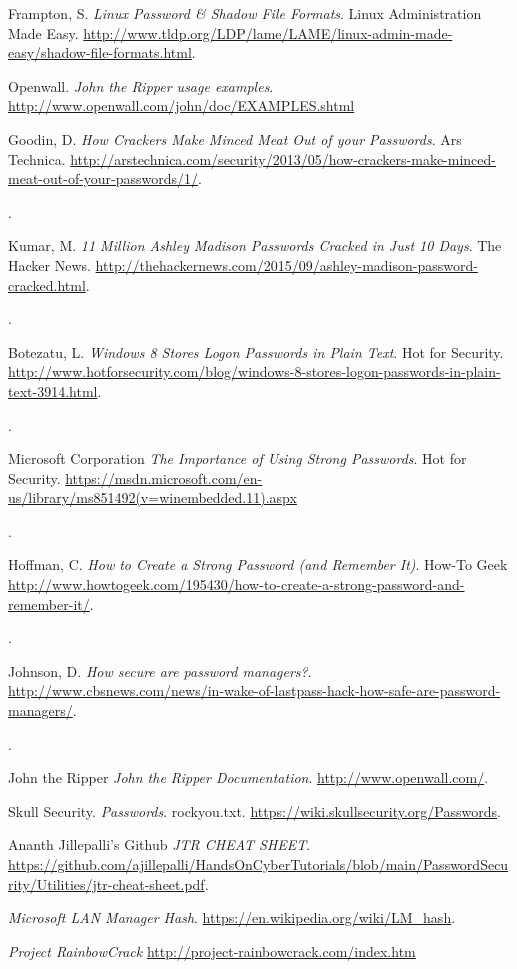 \documentclass[12pt]{extarticle}
\begin{document}
	\begin{thebibliography}{9}
		
		Frampton, S.
		\textit{Linux Password \& Shadow File Formats}.
		Linux Administration Made Easy.
		\url{http://www.tldp.org/LDP/lame/LAME/linux-admin-made-easy/shadow-file-formats.html}.
		
		Openwall.
		\textit{John the Ripper usage examples}.
		\url{http://www.openwall.com/john/doc/EXAMPLES.shtml}
		
		Goodin, D.
		\textit{How Crackers Make Minced Meat Out of your Passwords}.
		Ars Technica.
		\url{http://arstechnica.com/security/2013/05/how-crackers-make-minced-meat-out-of-your-passwords/1/}.
		\date{May 2013}.
		
		Kumar, M.
		\textit{11 Million Ashley Madison Passwords Cracked in Just 10 Days}.
		The Hacker News.
		\url{http://thehackernews.com/2015/09/ashley-madison-password-cracked.html}.
		\date{Sept 2015}.
		
		Botezatu, L.
		\textit{Windows 8 Stores Logon Passwords in Plain Text}.
		Hot for Security.
		\url{http://www.hotforsecurity.com/blog/windows-8-stores-logon-passwords-in-plain-text-3914.html}.
		\date{Oct 2015}.
		
		Microsoft Corporation
		\textit{The Importance of Using Strong Passwords}.
		Hot for Security.
		\url{https://msdn.microsoft.com/en-us/library/ms851492(v=winembedded.11).aspx}
		\date{2006}.
		
		Hoffman, C.
		\textit{How to Create a Strong Password (and Remember It)}.
		How-To Geek
		\url{http://www.howtogeek.com/195430/how-to-create-a-strong-password-and-remember-it/}.
		\date{May 2015}.
		
		Johnson, D.
		\textit{How secure are password managers?}.
		\url{http://www.cbsnews.com/news/in-wake-of-lastpass-hack-how-safe-are-password-managers/}.
		\date{June 2015}.
		
		John the Ripper
		\textit{John the Ripper Documentation}.
		\url{http://www.openwall.com/}.
		
		Skull Security.
		\textit{Passwords}.
		rockyou.txt.
		\url{https://wiki.skullsecurity.org/Passwords}.
		
		Ananth Jillepalli's Github
		\textit{JTR CHEAT SHEET}.
		\url{https://github.com/ajillepalli/HandsOnCyberTutorials/blob/main/PasswordSecurity/Utilities/jtr-cheat-sheet.pdf}.
		
		\textit{Microsoft LAN Manager Hash}.
		\url{https://en.wikipedia.org/wiki/LM_hash}.
		
		\textit{Project RainbowCrack}
		\url{http://project-rainbowcrack.com/index.htm}
		

		
	\end{thebibliography}
	
	
\end{document}
